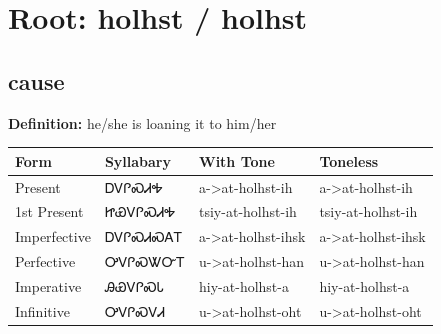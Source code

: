 \documentclass{article}%
\begin{document}
%
\normalsize%
\section*{Root: holhst / holhst}%
\subsection*{cause}%
\textbf{Definition: }%
he/she is loaning it to him/her%
\\[0.5em]%
\begin{tabular}{|l|l|l|l|}%
\hline%
\textbf{Form}&\textbf{Syllabary}&\textbf{With Tone}&\textbf{Toneless}\\%
\hline%
Present&ᎠᏙᎵᏍᏗᎭ&a{-}>at{-}holhst{-}ih&a{-}>at{-}holhst{-}ih\\%
1st Present&ᏥᏯᏙᎵᏍᏗᎭ&tsiy{-}at{-}holhst{-}ih&tsiy{-}at{-}holhst{-}ih\\%
Imperfective&ᎠᏙᎵᏍᏗᏍᎪᎢ&a{-}>at{-}holhst{-}ihsk&a{-}>at{-}holhst{-}ihsk\\%
Perfective&ᎤᏙᎵᏍᏔᏅᎢ&u{-}>at{-}holhst{-}han&u{-}>at{-}holhst{-}han\\%
Imperative&ᎯᏯᏙᎵᏍᏓ&hiy{-}at{-}holhst{-}a&hiy{-}at{-}holhst{-}a\\%
Infinitive&ᎤᏙᎵᏍᏙᏗ&u{-}>at{-}holhst{-}oht&u{-}>at{-}holhst{-}oht\\%
\hline%
\end{tabular}%
\\[1em]%
\end{document}
